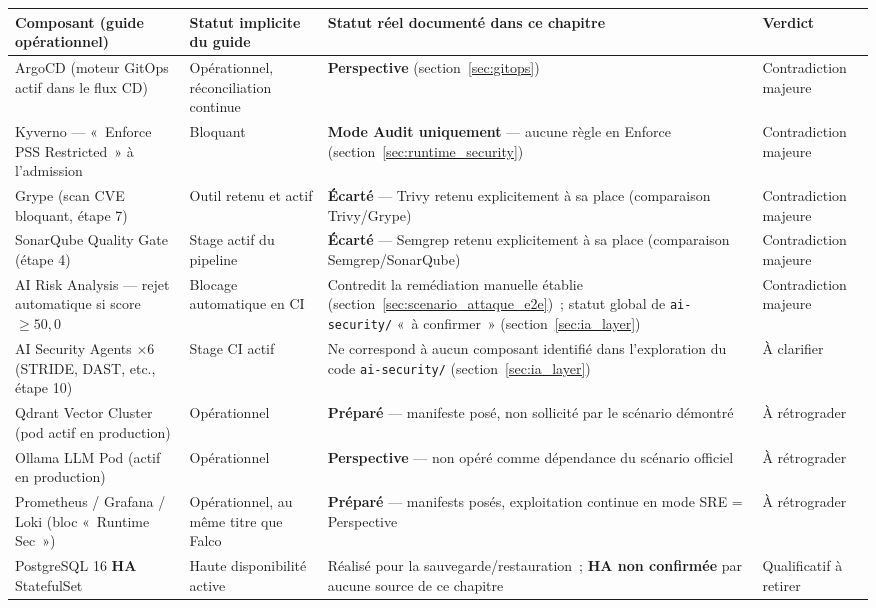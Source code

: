 \begin{table}[htbp]
\centering
\scriptsize
\begin{tabular}{@{}p{3.4cm}p{3.6cm}p{4.2cm}p{2.4cm}@{}}
\toprule
\textbf{Composant (guide opérationnel)} & \textbf{Statut implicite du guide} & \textbf{Statut réel documenté dans ce chapitre} & \textbf{Verdict} \\
\midrule
ArgoCD (moteur GitOps actif dans le flux CD) & Opérationnel, réconciliation continue & \textbf{Perspective} (section~\ref{sec:gitops}) & Contradiction majeure \\
Kyverno --- «~Enforce PSS Restricted~» à l'admission & Bloquant & \textbf{Mode Audit uniquement} --- aucune règle en Enforce (section~\ref{sec:runtime_security}) & Contradiction majeure \\
Grype (scan CVE bloquant, étape 7) & Outil retenu et actif & \textbf{Écarté} --- Trivy retenu explicitement à sa place (comparaison Trivy/Grype) & Contradiction majeure \\
SonarQube Quality Gate (étape 4) & Stage actif du pipeline & \textbf{Écarté} --- Semgrep retenu explicitement à sa place (comparaison Semgrep/SonarQube) & Contradiction majeure \\
AI Risk Analysis --- rejet automatique si score $\geq 50{,}0$ & Blocage automatique en CI & Contredit la remédiation manuelle établie (section~\ref{sec:scenario_attaque_e2e})~; statut global de \texttt{ai-security/} «~à confirmer~» (section~\ref{sec:ia_layer}) & Contradiction majeure \\
AI Security Agents $\times 6$ (STRIDE, DAST, etc., étape 10) & Stage CI actif & Ne correspond à aucun composant identifié dans l'exploration du code \texttt{ai-security/} (section~\ref{sec:ia_layer}) & À clarifier \\
Qdrant Vector Cluster (pod actif en production) & Opérationnel & \textbf{Préparé} --- manifeste posé, non sollicité par le scénario démontré & À rétrograder \\
Ollama LLM Pod (actif en production) & Opérationnel & \textbf{Perspective} --- non opéré comme dépendance du scénario officiel & À rétrograder \\
Prometheus / Grafana / Loki (bloc «~Runtime Sec~») & Opérationnel, au même titre que Falco & \textbf{Préparé} --- manifests posés, exploitation continue en mode SRE = Perspective & À rétrograder \\
PostgreSQL 16 \textbf{HA} StatefulSet & Haute disponibilité active & Réalisé pour la sauvegarde/restauration~; \textbf{HA non confirmée} par aucune source de ce chapitre & Qualificatif à retirer \\

\end{tabular}
\end{table}
